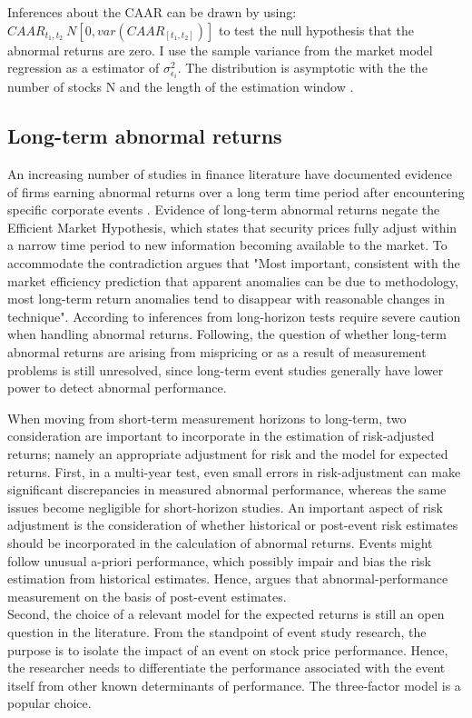 Inferences about the CAAR can be drawn by using: $CAAR_{t_1,t_2} ~ N[0,var(CAAR_{[t_1,t_2]})]$ to test the null hypothesis that the abnormal returns are zero. I use the sample variance from the market model regression as a estimator of $\sigma^2_{\epsilon_i}$. The distribution is asymptotic with the the number of stocks N and the length of the estimation window \cite{Event_studies}.  
 
 

\subsection{Long-term abnormal returns}

An increasing number of studies in finance literature have documented evidence of firms earning abnormal returns over a long term time period after encountering specific corporate events \citep{kothari}. Evidence of long-term abnormal returns negate the Efficient Market Hypothesis, which states that security prices fully adjust within a narrow time period to new information becoming available to the market. To accommodate the contradiction \cite{fama1998_events} argues that "Most important, consistent with the market efficiency prediction that apparent anomalies can be due to methodology, most long-term return anomalies tend to disappear with reasonable changes in technique". According to \cite{kothari} inferences from long-horizon tests require severe caution when handling abnormal returns. Following, the question of whether long-term abnormal returns are arising from mispricing or as a result of measurement problems is still unresolved, since long-term event studies generally have lower power to detect abnormal performance. 

When moving from short-term measurement horizons to long-term, two consideration are important to incorporate in the estimation of risk-adjusted returns; namely an appropriate adjustment for risk and the model for expected returns. First, in a multi-year test, even small errors in risk-adjustment can make significant discrepancies in measured abnormal performance, whereas the same issues become negligible for short-horizon studies. An important aspect of risk adjustment is the consideration of whether historical or post-event risk estimates should be incorporated in the calculation of abnormal returns. Events might follow unusual a-priori performance, which possibly impair and bias the risk estimation from historical estimates. Hence, \cite{kothari} argues that abnormal-performance measurement on the basis of post-event estimates. \\
Second, the choice of a relevant model for the expected returns is still an open question in the literature. From the standpoint of event study research, the purpose is to isolate the impact of an event on stock price performance. Hence, the researcher needs to differentiate the performance associated with the event itself from other known determinants of performance. The \cite{Fama_french_3fac} three-factor model is a popular choice. 


